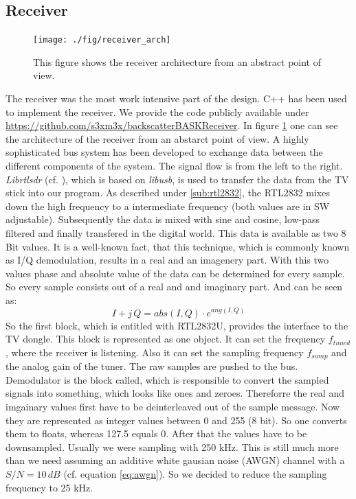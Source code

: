\documentclass[conference]{IEEEtran}
\begin{document}
\subsection{Receiver}
\begin{figure}[h]
\centering
\texttt{[image: ./fig/receiver\_arch]}
\caption{This figure shows the receiver architecture from an abstract point of view.}
\label{fig:receiver_arch}
\end{figure}
The receiver was the most work intensive part of the design. C++ has been used to implement the receiver. We provide the code publicly available under \url{https://github.com/s3xm3x/backscatterBASKReceiver}. In figure \ref{fig:receiver_arch} one can see the architecture of the receiver from an abstarct point of view. A highly sophisticated bus system has been developed to exchange data between the different components of the system. The signal flow is from the left to the right. \textit{Librtlsdr} (cf. \cite{github:librtlsdr}), which is based on \textit{libusb}, is used to transfer the data from the TV stick into our program. As described under \ref{sub:rtl2832}, the RTL2832 mixes down the high frequency to a intermediate frequency (both values are in SW adjustable). Subsequently the data is mixed with sine and cosine, low-pass filtered and finally transfered in the digital world. This data is available as two 8 Bit values. It is a well-known fact, that this technique, which is commonly known as I/Q demodulation, results in a real and an imagenery part. With this two values phase and absolute value of the data can be determined for every sample. So every sample consists out of a real and and imaginary part. And can be seen as:
\begin{equation}
	I+j\,Q = abs(I,Q) \cdot e^{ang(I,Q)} 
\end{equation} 
So the first block, which is entitled with RTL2832U, provides the interface to the TV dongle. This block is represented as one object. It can set the frequency \ensuremath{f_{tuned}}, where the receiver is listening. Also it can set the sampling frequency \ensuremath{f_{samp}} and the analog gain of the tuner. The raw samples are pushed to the bus. 
Demodulator is the block called, which is responsible to convert the sampled signals into something, which looks like ones and zeroes. Thereforre the real and imgainary values first have to be deinterleaved out of the sample message. Now they are represented as integer values between 0 and 255 (8 bit). So one converts them to floats, whereas 127.5 equals 0. After that the values have to be downsampled. Usually we were sampling with 250 kHz. This is still much more than we need assuming an additive white gausian noise (AWGN) channel with a \ensuremath{S/N = 10\,dB} (cf. equation \ref{eq:awgn}). So we decided to reduce the sampling frequency to 25 kHz.
\end{document}
